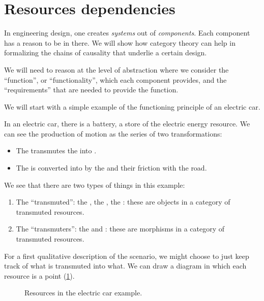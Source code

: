 
\section{Resources dependencies}
\label{sec:dependencies-design}

In engineering design, one creates \emph{systems} out of \emph{components}.
Each component has a reason to be in there.
We will show how category theory can help in formalizing the chains of causality that underlie a certain design.

We will need to reason at the level of abstraction where we consider the ``function'', or ``functionality'', which each component provides, and the ``requirements'' that are needed to provide the function.

We will start with a simple example of the functioning principle of an electric car.

In an electric car, there is a battery, a store of the electric energy resource.
We can see the production of motion as the series of two transformations:

\begin{itemize}
    \item The \motor transmutes the \electricpower into \rotationalmotion.
    \item The \rotationalmotion is converted into \translationalmotion by the \wheels and their friction with the road.
\end{itemize}

We see that there are two types of things in this example:
\begin{enumerate}
    \item The ``transmuted'': the \electricpower, the \rotationalmotion, the \translationalmotion: these are objects in a category of transmuted resources.
    \item The ``transmuters'': the \motor and \wheels: these are morphisms in a category of transmuted resources.
\end{enumerate}

For a first qualitative description of the scenario, we might choose to just keep track of what is transmuted into what.
We can draw a diagram in which each resource is a point (\cref{fig:e1}).

\begin{figure}[h!]
    \centering
    \caption{Resources in the electric car example.}
    \label{fig:e1}
\end{figure}

